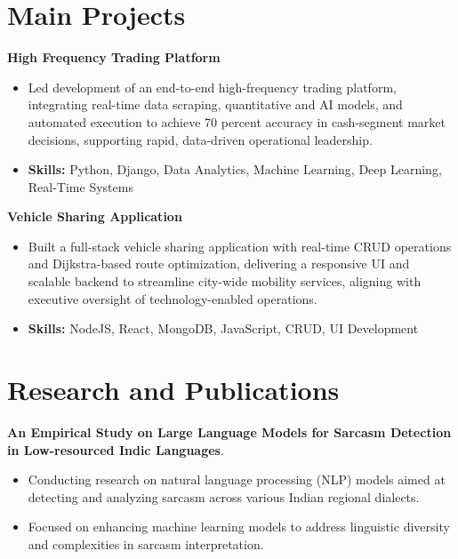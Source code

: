 \documentclass[a4paper,11pt]{article}
\begin{document}
\section{\textbf{Main Projects}}

\vspace{1mm}
  \textbf{High Frequency Trading Platform  }
\vspace{-1.5mm} %
\begin{itemize}
  \item Led development of an end-to-end high-frequency trading platform, integrating real-time data scraping, quantitative and AI models, and automated execution to achieve 70 percent accuracy in cash-segment market decisions, supporting rapid, data-driven operational leadership.
\vspace{-3mm}
  \item \textbf{Skills:} Python, Django, Data Analytics, Machine Learning, Deep Learning, Real-Time Systems
\end{itemize}


\vspace{1mm}
   \textbf{Vehicle Sharing Application }
\vspace{-1.5mm} %
\begin{itemize}
  \item Built a full-stack vehicle sharing application with real-time CRUD operations and Dijkstra-based route optimization, delivering a responsive UI and scalable backend to streamline city-wide mobility services, aligning with executive oversight of technology-enabled operations.
\vspace{-3mm}
  \item \textbf{Skills:} NodeJS, React, MongoDB, JavaScript, CRUD, UI Development
\end{itemize}



\section{\textbf{Research and Publications} \hfill }
\vspace{1mm}
  \textbf{An Empirical Study on Large Language Models for Sarcasm Detection in Low-resourced Indic Languages}.
\vspace{-1mm} %
\begin{itemize}
  \item Conducting research on natural language processing (NLP) models aimed at detecting and analyzing sarcasm across various Indian regional dialects.
\vspace{-3mm}
  \item Focused on enhancing machine learning models to address linguistic diversity and complexities in sarcasm interpretation.
\end{itemize}
\end{document}
